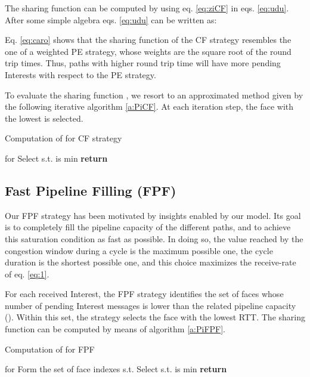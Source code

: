 \documentclass{sig-alternate-10pt}
\begin{document}
The sharing function can be computed by using eq. \ref{eq:ziCF} in eqs. \ref{eq:udu}. After some simple algebra eqs. \ref{eq:udu} can be written as:





Eq. \ref{eq:caro} shows that the sharing function  of the CF strategy resembles the one of a weighted PE strategy, whose weights are the square root of the round trip times. Thus, paths with higher round trip time will have more pending Interests with respect to the PE strategy.

To evaluate the sharing function , we resort to an approximated method given by the following iterative algorithm \ref{a:PiCF}. At each iteration step, the face with the lowest  is selected.




\begin{algorithm}
\caption{Computation of  for CF strategy}
\label{a:PiCF}
\begin{algorithmic}[1]
\State  for 
\State 
\For {}
\State Select  s.t.
\State  is min
\State 
\EndFor
\State \textbf{return} 
\EndProcedure
\end{algorithmic}
\end{algorithm}

\subsection{Fast Pipeline Filling (FPF)}
Our FPF strategy has been motivated by insights enabled by our model. Its goal is to completely fill the pipeline capacity of the different paths, and to achieve this saturation condition as fast as possible. In doing so, the value  reached by the congestion window during a cycle is the maximum possible one, the cycle duration  is the shortest possible one, and this choice maximizes the receive-rate of eq. \ref{eq:1}.

For each received Interest, the FPF strategy identifies the set  of faces whose number of pending Interest messages is lower than the related pipeline capacity (). Within this set, the strategy selects the face with the lowest RTT. The sharing function  can be computed by means of algorithm \ref{a:PiFPF}.

\begin{algorithm}
\caption{Computation of  for FPF }
\label{a:PiFPF}
\begin{algorithmic}[1]
\State  for 
\State 
\For {}
\State Form the set  of face indexes  s.t. 
\State Select  s.t.  is min
\State 
\EndFor
\State \textbf{return} 
\EndProcedure
\end{algorithmic}
\end{algorithm}
\end{document}
